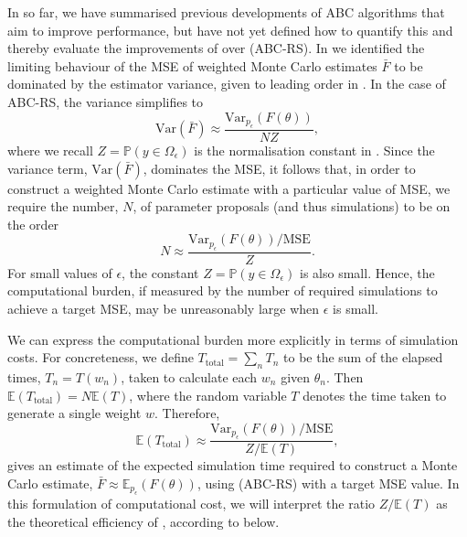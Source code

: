 \documentclass[review]{siamonline190516}
\begin{document}
In  so far, we have summarised previous developments of ABC algorithms that aim to improve performance, but have not yet defined how to quantify this and thereby evaluate the improvements of  over  (ABC-RS).
In  we identified the limiting behaviour of the MSE of weighted Monte Carlo estimates $\bar F$ to be dominated by the estimator variance, given to leading order in .
In the case of ABC-RS, the variance simplifies to
\begin{equation}
\label{eq:ABCRSVariance}
\mathrm{Var} \left( \bar F \right) 
\approx
\frac{\mathrm{Var}_{p_\epsilon} (F(\theta))}{NZ},
\end{equation}
where we recall $Z = \mathbb P(y \in \Omega_\epsilon)$ is the normalisation constant in .
Since the variance term, $\mathrm{Var} \left( \bar F \right)$, dominates the MSE, it follows that, in order to construct a weighted Monte Carlo estimate with a particular value of MSE, we require the number, $N$, of parameter proposals (and thus simulations) to be on the order
\[
N \approx \frac{\mathrm{Var}_{p_\epsilon} (F(\theta)) / \mathrm{MSE} }{Z}.
\]
For small values of $\epsilon$, the constant $Z = \mathbb P(y \in \Omega_\epsilon)$ is also small. 
Hence, the computational burden, if measured by the number of required simulations to achieve a target MSE, may be unreasonably large when $\epsilon$ is small.

We can express the computational burden more explicitly in terms of simulation costs.
For concreteness, we define $T_{\mathrm{total}} = \sum_n T_n$ to be the sum of the elapsed times, $T_n = T(w_n)$, taken to calculate each $w_n$ given $\theta_n$.
Then $\mathbb E(T_{\mathrm{total}}) = N \mathbb E(T)$, where the random variable $T$ denotes the time taken to generate a single weight $w$.
Therefore,
\[
\mathbb E(T_{\mathrm{total}}) 
\approx
\frac{\mathrm{Var}_{p_\epsilon} (F(\theta)) / \mathrm{MSE} }{Z / \mathbb E(T)},
\]
gives an estimate of the expected simulation time required to construct a Monte Carlo estimate, $\bar F \approx \mathbb E_{p_\epsilon}(F(\theta))$, using  (ABC-RS) with a target MSE value.
In this formulation of computational cost, we will interpret the ratio $Z/\mathbb E(T)$ as the theoretical efficiency of , according to  below.
\end{document}
